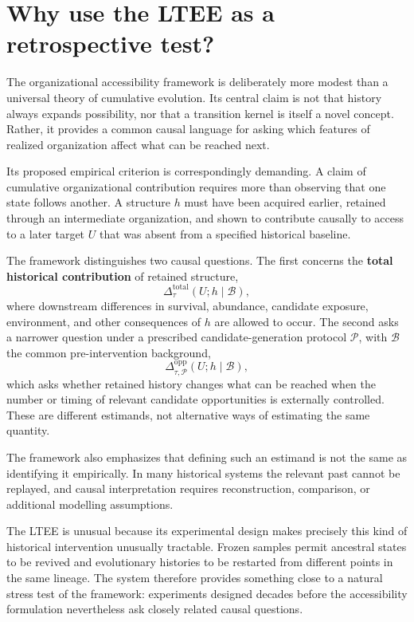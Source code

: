 \documentclass[11pt]{article}
\begin{document}
\section{Why use the LTEE as a retrospective test?}

The organizational accessibility framework is deliberately more modest than a universal theory of cumulative evolution. Its central claim is not that history always expands possibility, nor that a transition kernel is itself a novel concept. Rather, it provides a common causal language for asking which features of realized organization affect what can be reached next.

Its proposed empirical criterion is correspondingly demanding. A claim of cumulative organizational contribution requires more than observing that one state follows another. A structure $h$ must have been acquired earlier, retained through an intermediate organization, and shown to contribute causally to access to a later target $U$ that was absent from a specified historical baseline.

The framework distinguishes two causal questions. The first concerns the \textbf{total historical contribution} of retained structure,
\[
\Delta_{\tau}^{\mathrm{total}}(U;h\mid\mathcal B),
\]
where downstream differences in survival, abundance, candidate exposure, environment, and other consequences of $h$ are allowed to occur. The second asks a narrower question under a prescribed candidate-generation protocol $\mathcal P$, with $\mathcal B$ the common pre-intervention background,
\[
\Delta_{\tau,\mathcal P}^{\mathrm{opp}}(U;h\mid\mathcal B),
\]
which asks whether retained history changes what can be reached when the number or timing of relevant candidate opportunities is externally controlled. These are different estimands, not alternative ways of estimating the same quantity.

The framework also emphasizes that defining such an estimand is not the same as identifying it empirically. In many historical systems the relevant past cannot be replayed, and causal interpretation requires reconstruction, comparison, or additional modelling assumptions.

The LTEE is unusual because its experimental design makes precisely this kind of historical intervention unusually tractable. Frozen samples permit ancestral states to be revived and evolutionary histories to be restarted from different points in the same lineage. The system therefore provides something close to a natural stress test of the framework: experiments designed decades before the accessibility formulation nevertheless ask closely related causal questions.
\end{document}
